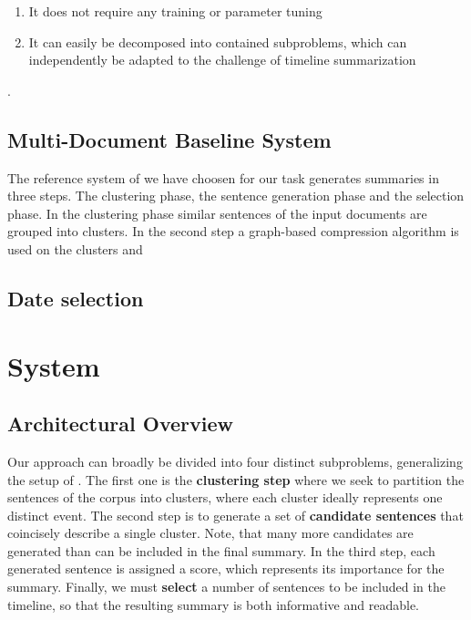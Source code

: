 \documentclass[a4paper,BCOR=10mm]{report}
\begin{document}
\begin{enumerate}
\item{It does not require any training or parameter tuning}
\item{It can easily be decomposed into contained subproblems, which can independently be adapted to the challenge of timeline summarization}
\end{enumerate}.


\section{Multi-Document Baseline System} \label{sec:mds-baseline}

The reference system of \citet{banerjee} we have choosen for our task generates summaries in three steps. The clustering phase, the sentence generation phase and the selection phase. In the clustering phase similar sentences of the input documents are grouped into clusters. In the second step a graph-based compression algorithm is used on the clusters and 




\section{Date selection}


\chapter{System}

\section{Architectural Overview}

Our approach can broadly be divided into four distinct subproblems, generalizing the setup of \citet{banerjee}.
The first one is the \textbf{clustering step} where we seek to partition the sentences of the corpus into clusters, where each cluster ideally represents one distinct event.
The second step is to generate a set of \textbf{candidate sentences} that coincisely describe a single cluster. Note, that many more candidates are generated than can be included in the final summary.
In the third step, each generated sentence is assigned a score, which represents its importance for the summary.
Finally, we must \textbf{select} a number of sentences to be included in the timeline, so that the resulting summary is both informative and readable.
\end{document}
